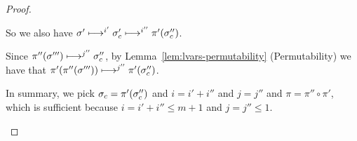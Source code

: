\begin{proof}
\begin{itemize}
    So we also have $\sigma' \longmapsto^{i'} \sigma_c'
    \longmapsto^{i''} \pi'(\sigma_c'')$.

    Since $\pi''(\sigma''') \longmapsto^{j''} \sigma_c''$, by
    Lemma~\ref{lem:lvars-permutability} (Permutability) we have that
    $\pi'(\pi''(\sigma''')) \longmapsto^{j''} \pi'(\sigma_c'')$.

    In summary, we pick $\sigma_c = \pi'(\sigma_c'')$ and $i = i' + i''$
    and $j = j''$ and $\pi = \pi'' \circ \pi'$, which is sufficient
    because $i = i' + i'' \leq m + 1$ and $j = j'' \leq 1$.
  \end{itemize}

 \end{proof}
